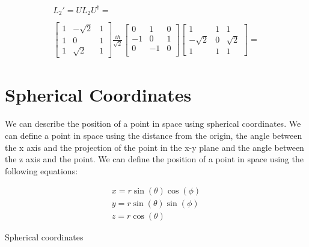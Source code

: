 \begin{equation}
  \begin{array}{c}
    L_2' = U L_2 U^{\dagger} =
    \\

    \\
    \left[\begin{matrix}
      1 & -\sqrt{2} & 1\\
      1 & 0 & 1\\
      1 & \sqrt{2} & 1
    \end{matrix}\right] \frac{i\hbar}{\sqrt{2}}\left[\begin{matrix}
      0 & 1 & 0\\
      -1 & 0 & 1\\
      0 & -1 & 0\\
    \end{matrix}\right]
    \left[
      \begin{matrix}
        1 & 1 & 1\\
        -\sqrt{2} & 0 & \sqrt{2}\\
        1 & 1 & 1
      \end{matrix}\right] =



  \end{array}
\end{equation}




\section{Spherical Coordinates}

We can describe the position of a point in space using spherical coordinates. We can define a point in space using the distance from the origin, the angle between the x axis and the projection of the point in the x-y plane and the angle between the z axis and the point. We can define the position of a point in space using the following equations:

\begin{equation}
  \begin{array}{c}
    x = r\sin(\theta)\cos(\phi)\\
    y = r\sin(\theta)\sin(\phi)\\
    z = r\cos(\theta)
  \end{array}
\end{equation}

\begin{marginfigure}[-4cm]
  \caption{Spherical coordinates}
\end{marginfigure}

